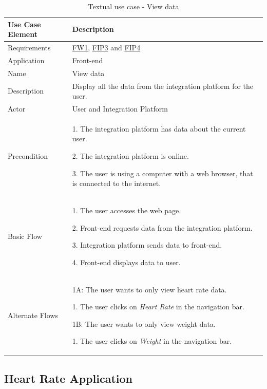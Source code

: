 \begin{table}[H]
\begin{center}
\begin{tabular}{ l | p{10cm} }
  \hline
  \textbf{Use Case Element} & \textbf{Description} \\ \hline\hline
  Requirements & \hyperref[table:reqfrontend]{FW1}, \hyperref[table:reqip]{FIP3} and \hyperref[table:reqip]{FIP4}\\ \hline
  Application & Front-end \\ \hline
  Name & View data \\ \hline
  Description & Display all the data from the integration platform for the user. \\ \hline
  Actor & User and Integration Platform \\ \hline
  Precondition &
	\par 1. The integration platform has data about the current user.
	\par 2. The integration platform is online.
	\par 3. The user is using a computer with a web browser, that is connected to the internet.
	\\ \hline
  Basic Flow & 
  	\par 1. The user accesses the web page.
  	\par 2. Front-end requests data from the integration platform.
  	\par 3. Integration platform sends data to front-end.
  	\par 4. Front-end displays data to user.
  	\\ \hline
  Alternate Flows & 
  	\par 1A: The user wants to only view heart rate data.
  	\par\hspace{15pt} 1. The user clicks on \textit{Heart Rate} in the navigation bar.
  	\par 1B: The user wants to only view weight data.
  	\par\hspace{15pt} 1. The user clicks on \textit{Weight} in the navigation bar.
  \\ \hline
\end{tabular}
\end{center}
\caption{Textual use case - View data}
\label{table:use-case-view-data}
\end{table}

\subsection{Heart Rate Application}

